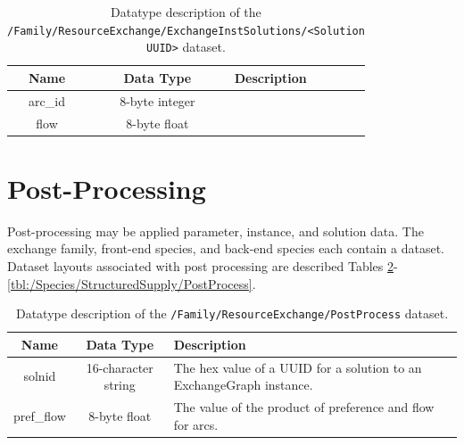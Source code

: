\begin{table}[h!]
\centering
\caption{\label{tbl:/Family/ResourceExchange/ExchangeInstSolutions/id_2fa2ee6eb9654baf8780a99713dd5e69}
Datatype description of the \lstinline[basicstyle=\ttfamily\color{black}]|/Family/ResourceExchange/ExchangeInstSolutions/<Solution UUID>| dataset.}
\begin{tabularx}{\columnwidth-10pt}{|c|c|X|} %
\hline
\textbf{Name} & \textbf{Data Type} & \textbf{Description}       \\ \hline
arc\_id & 8-byte integer &  \\ \hline
flow & 8-byte float &  \\ \hline
\end{tabularx}
\end{table}

\section{Post-Processing}

Post-processing may be applied parameter, instance, and solution data. The
exchange family, front-end species, and back-end species each contain a
 dataset. Dataset layouts associated with post processing are
described Tables
\ref{tbl:/Family/ResourceExchange/PostProcess}-\ref{tbl:/Species/StructuredSupply/PostProcess}.

\begin{table}[h!]
\centering
\caption{\label{tbl:/Family/ResourceExchange/PostProcess}
Datatype description of the \lstinline[basicstyle=\ttfamily\color{black}]|/Family/ResourceExchange/PostProcess| dataset.}
\begin{tabularx}{\columnwidth-10pt}{|c|c|X|} %
\hline
\textbf{Name} & \textbf{Data Type} & \textbf{Description}       \\ \hline
solnid & 16-character string & The hex value of a UUID for a solution to an ExchangeGraph instance. \\ \hline
pref\_flow & 8-byte float & The value of the product of preference and flow for arcs. \\ \hline
\end{tabularx}
\end{table}

